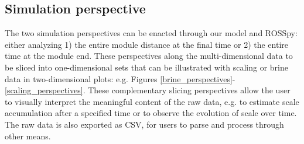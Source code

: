 \documentclass[journal=ACSES&TWater,manuscript=article]{achemso}
\begin{document}
\subsection{Simulation perspective}
The two simulation perspectives can be enacted through our model and ROSSpy: either analyzing 1) the entire module distance at the final time or 2) the entire time at the module end. These perspectives along the multi-dimensional data to be sliced into one-dimensional sets that can be illustrated with scaling or brine data in two-dimensional plots: e.g. Figures \ref{brine_perspectives}-\ref{scaling_perspectives}. These complementary slicing perspectives allow the user to visually interpret the meaningful content of the raw data, e.g. to estimate scale accumulation after a specified time \cite{Chai2007UltrasoundModules} or to observe the evolution of scale over time. The raw data is also exported as CSV, for users to parse and process through other means.
\end{document}
